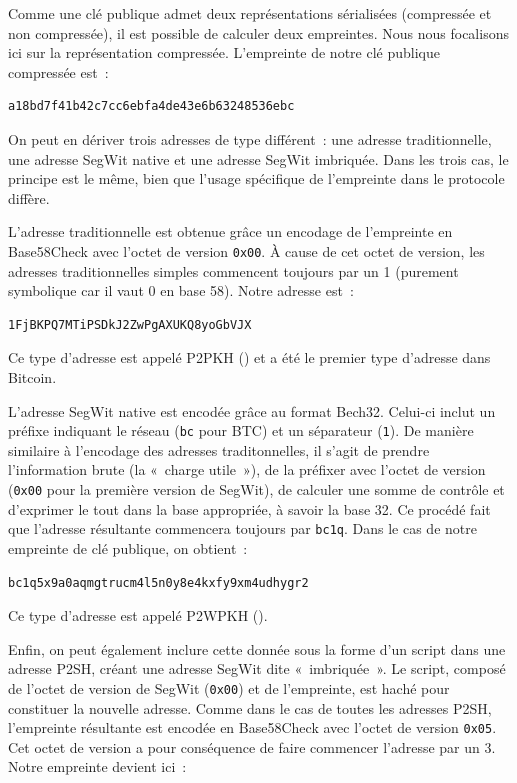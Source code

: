 Comme une clé publique admet deux représentations sérialisées (compressée et non compressée), il est possible de calculer deux empreintes. Nous nous focalisons ici sur la représentation compressée. L'empreinte de notre clé publique compressée est~:

\begin{Verbatim}[fontsize=\footnotesize]
a18bd7f41b42c7cc6ebfa4de43e6b63248536ebc
\end{Verbatim}

On peut en dériver trois adresses de type différent~: une adresse traditionnelle, une adresse SegWit native et une adresse SegWit imbriquée. Dans les trois cas, le principe est le même, bien que l'usage spécifique de l'empreinte dans le protocole diffère.

L'adresse traditionnelle est obtenue grâce un encodage de l'empreinte en Base58Check avec l'octet de version \texttt{0x00}. À cause de cet octet de version, les adresses traditionnelles simples commencent toujours par un 1 (purement symbolique car il vaut 0 en base 58). Notre adresse est~:

\begin{Verbatim}[fontsize=\small]
1FjBKPQ7MTiPSDkJ2ZwPgAXUKQ8yoGbVJX
\end{Verbatim}

Ce type d'adresse est appelé P2PKH () et a été le premier type d'adresse dans Bitcoin.

L'adresse SegWit native est encodée grâce au format Bech32. Celui-ci inclut un préfixe indiquant le réseau (\texttt{bc} pour BTC) et un séparateur (\texttt{1}). De manière similaire à l'encodage des adresses traditonnelles, il s'agit de prendre l'information brute (la «~charge utile~»), de la préfixer avec l'octet de version (\texttt{0x00} pour la première version de SegWit), de calculer une somme de contrôle et d'exprimer le tout dans la base appropriée, à savoir la base 32. Ce procédé fait que l'adresse résultante commencera toujours par \texttt{bc1q}. Dans le cas de notre empreinte de clé publique, on obtient~:

\begin{Verbatim}[fontsize=\small]
bc1q5x9a0aqmgtrucm4l5n0y8e4kxfy9xm4udhygr2
\end{Verbatim}

Ce type d'adresse est appelé P2WPKH ().

Enfin, on peut également inclure cette donnée sous la forme d'un script dans une adresse P2SH, créant une adresse SegWit dite «~imbriquée~». Le script, composé de l'octet de version de SegWit (\texttt{0x00}) et de l'empreinte, est haché pour constituer la nouvelle adresse. Comme dans le cas de toutes les adresses P2SH, l'empreinte résultante est encodée en Base58Check avec l'octet de version \texttt{0x05}. Cet octet de version a pour conséquence de faire commencer l'adresse par un 3. Notre empreinte devient ici~:


